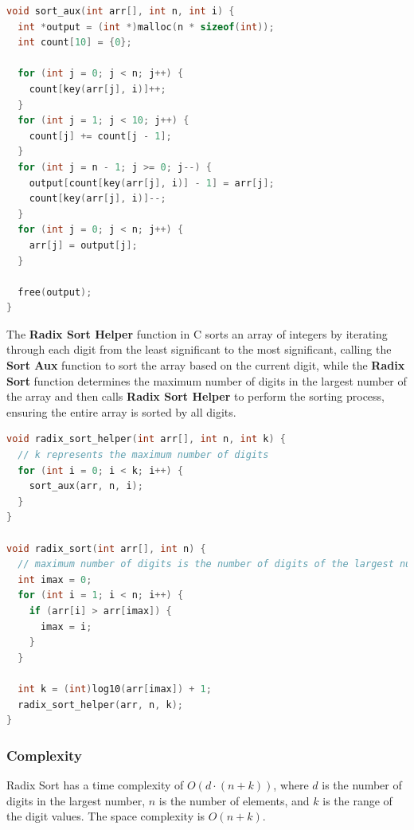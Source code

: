\documentclass{article}
\begin{document}
\newpage
\begin{lstlisting}[language=C, caption=Sort Aux implementation]
void sort_aux(int arr[], int n, int i) {
  int *output = (int *)malloc(n * sizeof(int));
  int count[10] = {0};

  for (int j = 0; j < n; j++) {
    count[key(arr[j], i)]++;
  }
  for (int j = 1; j < 10; j++) {
    count[j] += count[j - 1];
  }
  for (int j = n - 1; j >= 0; j--) {
    output[count[key(arr[j], i)] - 1] = arr[j];
    count[key(arr[j], i)]--;
  }
  for (int j = 0; j < n; j++) {
    arr[j] = output[j];
  }

  free(output);
}
\end{lstlisting}

The \textbf{Radix Sort Helper} function in C sorts an array of integers by iterating through each digit from the least significant to the most significant, calling the \textbf{Sort Aux} function to sort the array based on the current digit, while the \textbf{Radix Sort} function determines the maximum number of digits in the largest number of the array and then calls \textbf{Radix Sort Helper} to perform the sorting process, ensuring the entire array is sorted by all digits.

\begin{lstlisting}[language=C, caption=Radix Sort implementation]
void radix_sort_helper(int arr[], int n, int k) {
  // k represents the maximum number of digits
  for (int i = 0; i < k; i++) {
    sort_aux(arr, n, i);
  }
}

void radix_sort(int arr[], int n) {
  // maximum number of digits is the number of digits of the largest number
  int imax = 0;
  for (int i = 1; i < n; i++) {
    if (arr[i] > arr[imax]) {
      imax = i;
    }
  }

  int k = (int)log10(arr[imax]) + 1;
  radix_sort_helper(arr, n, k);
}
\end{lstlisting}

\subsubsection{Complexity}
Radix Sort has a time complexity of $O(d \cdot (n + k))$, where $d$ is the number of digits in the largest number, $n$ is the number of elements, and $k$ is the range of the digit values. The space complexity is $O(n + k)$.
\end{document}
